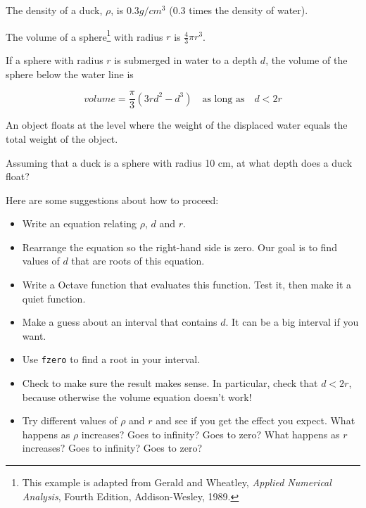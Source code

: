 \begin{ex}
\label{duck}

The density of a duck, $\rho$, is $0.3 g / cm^3$ (0.3 times the
density of water).

The volume of a sphere\footnote{This example is adapted from Gerald
and Wheatley, {\em Applied Numerical Analysis}, Fourth Edition,
Addison-Wesley, 1989.} with radius $r$ is $\frac{4}{3} \pi r^3$.

If a sphere with radius $r$ is submerged in water to a depth $d$, the
volume of the sphere below the water line is 

\[ volume = \frac{\pi}{3} (3r d^2 - d^3) \quad 
\mbox{as long as} \quad d < 2 r \]

An object floats at the level where the weight of the displaced water
equals the total weight of the object.

Assuming that a duck is a sphere with radius 10 cm, at what depth does
a duck float?

Here are some suggestions about how to proceed:

\begin{itemize}

\item Write an equation relating $\rho$, $d$ and $r$.

\item Rearrange the equation so the right-hand side is zero.
Our goal is to find values of $d$ that are roots of this equation.

\item Write a Octave function that evaluates this function. Test it,
  then make it a quiet function.

\item Make a guess about an interval that contains $d$. It can be a big
interval if you want.

\item Use {\tt fzero} to find a root in your interval.

\item Check to make sure the result makes sense. In particular,
  check that $d < 2 r$, because otherwise the volume equation
  doesn't work!

\item Try different values of $\rho$ and $r$ and see if you get the
effect you expect. What happens as $\rho$ increases? Goes to
infinity? Goes to zero? What happens as $r$ increases? Goes to
infinity? Goes to zero?

\end{itemize}


\end{ex}




